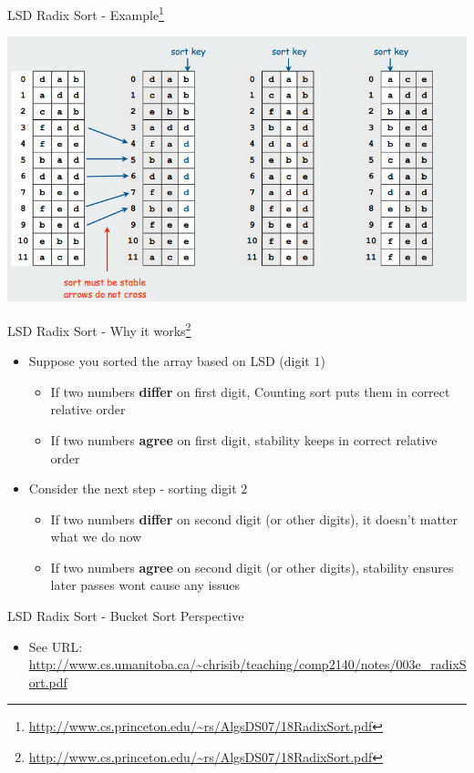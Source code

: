 \documentclass{beamer}
\begin{document}
\begin{frame}{LSD Radix Sort - Example\footnote{\url{http://www.cs.princeton.edu/~rs/AlgsDS07/18RadixSort.pdf}}}
\begin{center}
    \includegraphics[scale=0.4]{radixSortEg1.png}
\end{center}
\end{frame}


\begin{frame}{LSD Radix Sort - Why it works\footnote{\url{http://www.cs.princeton.edu/~rs/AlgsDS07/18RadixSort.pdf}}}
\begin{itemize}
\item Suppose you sorted the array based on LSD (digit $1$)
\begin{itemize}
    \item If two numbers {\bf differ} on first digit, Counting sort puts them in correct relative order
    \item If two numbers {\bf agree} on first digit, stability keeps in correct relative order
\end{itemize}
\item Consider the next step - sorting digit $2$ 
\begin{itemize}
    \item If two numbers {\bf differ} on second digit (or other digits), it doesn't matter what we do now
    \item If two numbers {\bf agree} on second digit (or other digits), stability ensures later passes wont cause any issues
\end{itemize}
\end{itemize}
\end{frame}

\begin{frame}{LSD Radix Sort - Bucket Sort Perspective}
\begin{itemize}
   \item See URL: \url{http://www.cs.umanitoba.ca/~chrisib/teaching/comp2140/notes/003e_radixSort.pdf} 
\end{itemize}
\end{frame}
\end{document}
